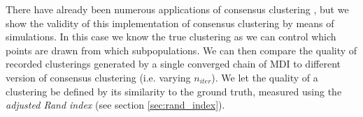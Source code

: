 \documentclass[12pt]{article} %
\begin{document}
	
	There have already been numerous applications of consensus clustering \cite{LiWeightedConsensusClustering2008} \cite{LancichinettiConsensusclusteringcomplex2012} \cite{BreimanRandomForests1}, but we show the validity of this implementation of consensus clustering by means of simulations. In this case we know the true clustering as we can control which points are drawn from which subpopulations. We can then compare the quality of recorded clusterings generated by a single converged chain of MDI to different version of consensus clustering (i.e. varying $n_{iter}$). We let the quality of a clustering be defined by its similarity to the ground truth, measured using the \emph{adjusted Rand index} (see section \ref{sec:rand_index}).
	


%	
	
	
\end{document}
